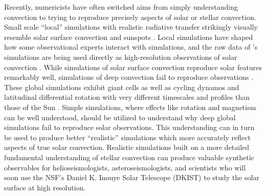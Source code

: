 Recently, numericists have often switched aims from simply understanding convection to trying to reproduce precisely aspects of solar or stellar convection.
Small scale ``local'' simulations with realistic radiative transfer strikingly visually resemble solar surface convection and sunspots \cite{stein&nordlund1998, rempel&all2009, stein&nordlund2012, rempel2014}.
Local simulations have shaped how some observational experts interact with simulations, and the raw data of \cite{rempel2014}'s simulations are being used directly as high-resolution observations of solar convection \cite[see e.g.,][and others]{vankooten&cranmer2017, shchukina&trujillo2019}.
While simulations of solar surface convection reproduce solar features remarkably well, simulations of deep convection fail to reproduce observations  \cite{hanasoge&all2015}.
These global simulations exhibit giant cells as well as cycling dynamos and latitudinal differential rotation with very different timescales and profiles than those of the Sun \cite{brown&all2010, brown&all2011, guerrero&all2016, hotta&all2016, brun&all2017, strugarek&all2018}.
Simple simulations, where effects like rotation and magnetism can be well understood, should be utilized to understand why deep global simulations fail to reproduce solar observations.
This understanding can in turn be used to produce better ``realistic'' simulations which more accurately reflect aspects of true solar convection.
Realistic simulations built on a more detailed fundamental understanding of stellar convection can produce valuable synthetic observables for helioseismologists, asteroseismologists, and scientists who will soon use the NSF's Daniel K. Inouye Solar Telescope (DKIST) to study the solar surface at high resolution.



